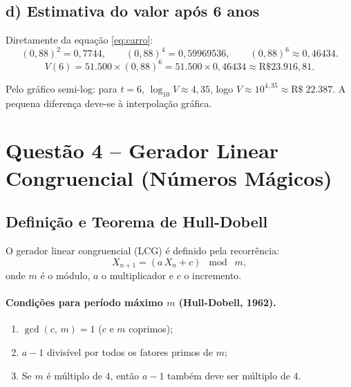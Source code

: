 \documentclass[12pt,a4paper]{article}
\theoremstyle{definition}
\newcommand{\resultado}[1]{%
  \begin{center}
    \fbox{\parbox{0.85\linewidth}{\centering $\displaystyle #1$}}
  \end{center}
}
\begin{document}
\subsection{d) Estimativa do valor ap\'os 6 anos}

Diretamente da equa\c{c}\~ao \eqref{eq:carro}:
\begin{equation}
  (0{,}88)^2 = 0{,}7744,
  \qquad
  (0{,}88)^4 = 0{,}59969536,
  \qquad
  (0{,}88)^6 \approx 0{,}46434.
\end{equation}
\begin{equation}
  V(6) = 51{.}500 \times (0{,}88)^6
        = 51{.}500 \times 0{,}46434
        \approx \text{R\$ } 23{.}916{,}81.
\end{equation}

Pelo gr\'afico semi-log: para $t = 6$, $\log_{10} V \approx 4{,}35$,
logo $V \approx 10^{4{,}35} \approx \text{R\$}\;22{.}387$.
A pequena diferen\c{c}a deve-se \`a interpola\c{c}\~ao gr\'afica.

\resultado{V(6) \approx \text{R\$ }23{.}917}

\section{Quest\~ao 4 -- Gerador Linear Congruencial (N\'umeros M\'agicos)}

\subsection{Defini\c{c}\~ao e Teorema de Hull-Dobell}

O gerador linear congruencial (LCG) \'e definido pela recorr\^encia:
\begin{equation}
  X_{n+1} = (a\,X_n + c)\;\bmod\;m,
  \label{eq:lcg}
\end{equation}
onde $m$ \'e o m\'odulo, $a$ o multiplicador e $c$ o incremento.

\paragraph{Condi\c{c}\~oes para per\'iodo m\'aximo $m$ (Hull-Dobell, 1962).}
\begin{enumerate}
  \item $\gcd(c,\,m) = 1$ \quad ($c$ e $m$ coprimos);
  \item $a - 1$ divisível por todos os fatores primos de $m$;
  \item Se $m$ é múltiplo de $4$, então $a-1$ também deve ser múltiplo de $4$.
\end{enumerate}
\end{document}
